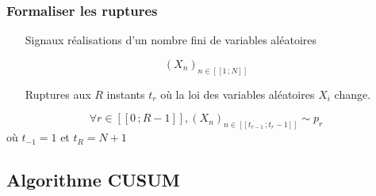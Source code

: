 \documentclass{beamer}
\begin{document}
\begin{frame}

\frametitle{Formaliser les ruptures}

\begin{itemize}
	\item[Signaux] réalisations d'un nombre fini de variables aléatoires
\end{itemize}

\vspace{-.4cm}
\[ (X_n)_{n \in [\![ 1\,; N ]\!] } \]
\phantom{kcahkcah}
	
\begin{itemize}
	\item[Ruptures]aux $R$ instants $t_r$ où la loi des variables aléatoires $X_i$ change.
\end{itemize}

\vspace{-.4cm}
\[ \forall r \in [\![0\,;R-1]\!] , (X_n)_{n\in[\![t_{r-1}\,;t_r-1]\!]} \sim p_r\]
\hspace{.7cm}
où $t_{-1}=1$ et $t_R=N+1$


\end{frame}

\subsection{Algorithme CUSUM}
\end{document}

